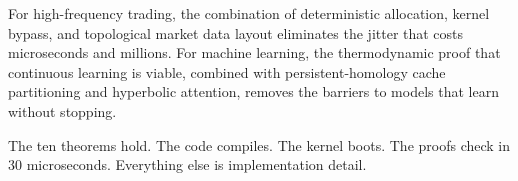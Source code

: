 \documentclass[11pt, a4paper]{article}
\theoremstyle{proofform}
\numberwithin{innerpoints}{subsection}
\numberwithin{disproof}{subsection}
\theoremstyle{mathproof}
\begin{document}
For high-frequency trading, the combination of deterministic allocation, kernel bypass, and topological market data layout eliminates the jitter that costs microseconds and millions. For machine learning, the thermodynamic proof that continuous learning is viable, combined with persistent-homology cache partitioning and hyperbolic attention, removes the barriers to models that learn without stopping.

The ten theorems hold. The code compiles. The kernel boots. The proofs check in 30 microseconds. Everything else is implementation detail.



\end{document}
